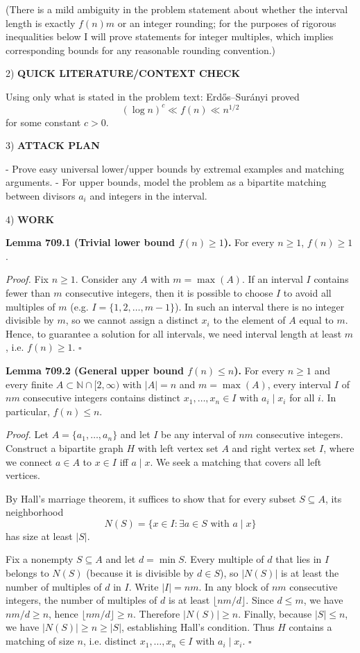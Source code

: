(There is a mild ambiguity in the problem statement about whether the interval length is exactly $f(n)m$ or an integer rounding; for the purposes of rigorous inequalities below I will prove statements for integer multiples, which implies corresponding bounds for any reasonable rounding convention.)

2) \textbf{QUICK LITERATURE/CONTEXT CHECK}

Using only what is stated in the problem text: Erd\H{o}s--Sur\'anyi proved
\[(\log n)^c \ll f(n) \ll n^{1/2}\]
for some constant $c>0$.

3) \textbf{ATTACK PLAN}

- Prove easy universal lower/upper bounds by extremal examples and matching arguments.
- For upper bounds, model the problem as a bipartite matching between divisors $a_i$ and integers in the interval.

4) \textbf{WORK}

\textbf{Lemma 709.1 (Trivial lower bound $f(n)\ge 1$).}
For every $n\ge 1$, $f(n)\ge 1$.

\textit{Proof.}
Fix $n\ge 1$. Consider any $A$ with $m=\max(A)$.
If an interval $I$ contains fewer than $m$ consecutive integers, then it is possible to choose $I$ to avoid all multiples of $m$ (e.g. $I=\{1,2,\dots,m-1\}$).
In such an interval there is no integer divisible by $m$, so we cannot assign a distinct $x_i$ to the element of $A$ equal to $m$.
Hence, to guarantee a solution for all intervals, we need interval length at least $m$, i.e. $f(n)\ge 1$.
\hfill$\square$

\textbf{Lemma 709.2 (General upper bound $f(n)\le n$).}
For every $n\ge 1$ and every finite $A\subset\mathbb{N}\cap[2,\infty)$ with $|A|=n$ and $m=\max(A)$, every interval $I$ of $nm$ consecutive integers contains distinct $x_1,\dots,x_n\in I$ with $a_i\mid x_i$ for all $i$.
In particular, $f(n)\le n$.

\textit{Proof.}
Let $A=\{a_1,\dots,a_n\}$ and let $I$ be any interval of $nm$ consecutive integers.
Construct a bipartite graph $H$ with left vertex set $A$ and right vertex set $I$, where we connect $a\in A$ to $x\in I$ iff $a\mid x$.
We seek a matching that covers all left vertices.

By Hall's marriage theorem, it suffices to show that for every subset $S\subseteq A$, its neighborhood
\[
N(S)=\{x\in I:\exists a\in S\text{ with }a\mid x\}
\]
has size at least $|S|$.

Fix a nonempty $S\subseteq A$ and let $d=\min S$.
Every multiple of $d$ that lies in $I$ belongs to $N(S)$ (because it is divisible by $d\in S$), so $|N(S)|$ is at least the number of multiples of $d$ in $I$.
Write $|I|=nm$.
In any block of $nm$ consecutive integers, the number of multiples of $d$ is at least $\lfloor nm/d\rfloor$.
Since $d\le m$, we have $nm/d\ge n$, hence $\lfloor nm/d\rfloor\ge n$.
Therefore $|N(S)|\ge n$.
Finally, because $|S|\le n$, we have $|N(S)|\ge n\ge |S|$, establishing Hall's condition.
Thus $H$ contains a matching of size $n$, i.e. distinct $x_1,\dots,x_n\in I$ with $a_i\mid x_i$.
\hfill$\square$


